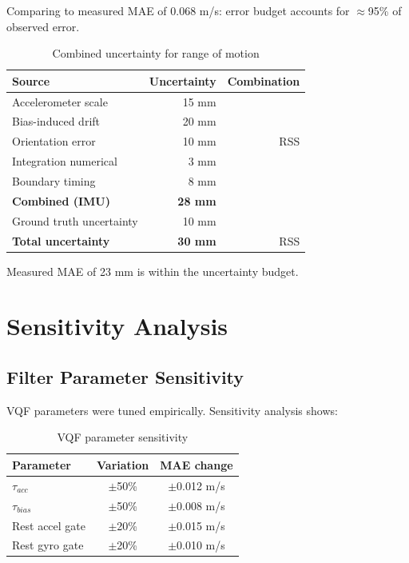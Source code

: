 Comparing to measured MAE of 0.068 m/s: error budget accounts for $\approx$95\% of observed error.

\begin{table}[h]
    \centering
    \caption{Combined uncertainty for range of motion}
    \label{tab:total_uncertainty_rom}
    \begin{tabular}{lrr}
        \toprule
        \textbf{Source} & \textbf{Uncertainty} & \textbf{Combination} \\
        \midrule
        Accelerometer scale & 15 mm & \multirow{5}{*}{RSS} \\
        Bias-induced drift & 20 mm & \\
        Orientation error & 10 mm & \\
        Integration numerical & 3 mm & \\
        Boundary timing & 8 mm & \\
        \midrule
        \textbf{Combined (IMU)} & \textbf{28 mm} & \\
        Ground truth uncertainty & 10 mm & \\
        \midrule
        \textbf{Total uncertainty} & \textbf{30 mm} & RSS \\
        \bottomrule
    \end{tabular}
\end{table}

Measured MAE of 23 mm is within the uncertainty budget.

\section{Sensitivity Analysis}

\subsection{Filter Parameter Sensitivity}

VQF parameters were tuned empirically. Sensitivity analysis shows:

\begin{table}[h]
    \centering
    \caption{VQF parameter sensitivity}
    \label{tab:filter_sensitivity}
    \begin{tabular}{lcc}
        \toprule
        \textbf{Parameter} & \textbf{Variation} & \textbf{MAE change} \\
        \midrule
        $\tau_{acc}$ & $\pm$50\% & $\pm$0.012 m/s \\
        $\tau_{bias}$ & $\pm$50\% & $\pm$0.008 m/s \\
        Rest accel gate & $\pm$20\% & $\pm$0.015 m/s \\
        Rest gyro gate & $\pm$20\% & $\pm$0.010 m/s \\
        \bottomrule
    \end{tabular}
\end{table}

